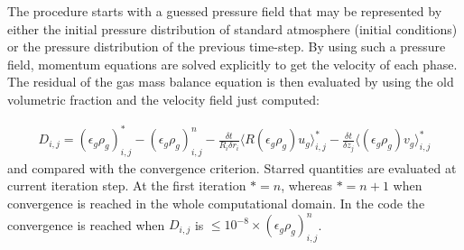 The procedure starts with a guessed pressure field that may be represented
by either the initial pressure distribution of standard atmosphere (initial
conditions) or the pressure distribution of the previous time-step.
By using such a pressure field, momentum equations are solved explicitly to get the 
velocity of each phase.
The residual of the gas mass balance equation is then evaluated by using 
the old volumetric fraction and the velocity field just computed: 

\begin{eqnarray}
D_{i,j} =  (\epsilon_g \rho_g)_{i,j}^{*} - (\epsilon_g \rho_g)_{i,j}^{n}
-\frac {\delta t} {R_i \delta r_i} \langle R (\epsilon_g \rho_g) u_g \rangle_{i,j}^{*}
- \frac {\delta t} {\delta z_j } \langle (\epsilon_g \rho_g) v_g \rangle_{i,j}^{*}
\nonumber
\end{eqnarray}
%
and compared with the convergence criterion. Starred quantities are evaluated at current
iteration step. At the first iteration $*=n$, whereas $*=n+1$ when convergence is
reached in the whole computational domain.
In the code the convergence is reached when $D_{i,j}$ is $\le 10^{-8} \times 
(\epsilon_g \rho_g)_{i,j}^{n}$. 

